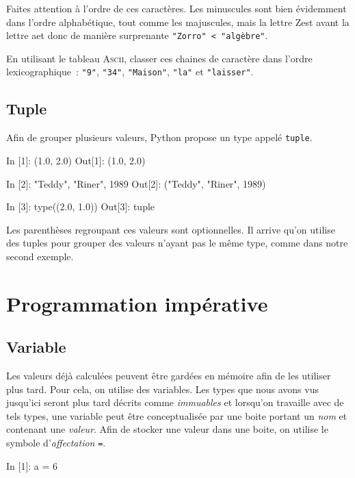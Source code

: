 \documentclass{magnolia}
\begin{document}
\noindent
Faites attention à l'ordre de ces caractères. Les minuscules sont bien évidemment
dans l'ordre alphabétique, tout comme les majuscules, mais la lettre \og Z\fg est avant
la lettre \og a\fg et donc de manière surprenante \verb_"Zorro" < "algèbre"_.
\vspace{2ex}
\begin{exoUnique}
\exo En utilisant le tableau \textsc{Ascii}, classer ces chaines de caractère dans l'ordre
  lexicographique~: \verb_"9"_, \verb_"34"_, \verb_"Maison"_, \verb_"la"_ et \verb_"laisser"_.
\end{exoUnique}

\subsection{Tuple}

Afin de grouper plusieurs valeurs, Python propose un type
appelé \verb_tuple_.

\begin{pythoncode}
In [1]: (1.0, 2.0)
Out[1]: (1.0, 2.0)

In [2]: "Teddy", "Riner", 1989
Out[2]: ("Teddy", "Riner", 1989)

In [3]: type((2.0, 1.0))
Out[3]: tuple
\end{pythoncode}

\noindent
Les parenthèses regroupant ces valeurs sont optionnelles.
Il arrive qu'on utilise des tuples pour grouper des valeurs n'ayant pas
le même type, comme dans notre second exemple.

\section{Programmation impérative}
\subsection{Variable}

Les valeurs déjà calculées peuvent être gardées en mémoire afin de les utiliser plus tard.
Pour cela, on utilise des variables. Les types que nous avons vus jusqu'ici
seront plus tard décrits comme \emph{immuables} et lorsqu'on travaille avec de tels types, une
variable peut être conceptualisée par une boite portant un \emph{nom} et contenant une
\emph{valeur}. Afin de stocker une valeur dans une boite, on utilise le symbole
d'\emph{affectation} \og\verb_=_\fg.

\begin{pythoncode}
In [1]: a = 6   
\end{pythoncode}
\end{document}
